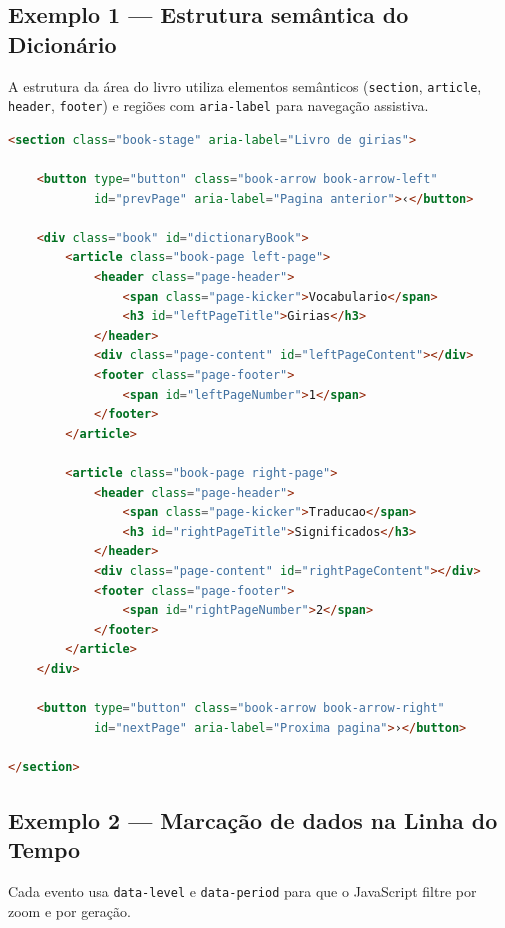 \documentclass[12pt,a4paper]{article}
\begin{document}
\subsection{Exemplo 1 — Estrutura semântica do Dicionário}

A estrutura da área do livro utiliza elementos semânticos (\texttt{section}, \texttt{article},
\texttt{header}, \texttt{footer}) e regiões com \texttt{aria-label} para navegação assistiva.

\begin{lstlisting}[language=HTML, caption={Estrutura principal do livro}]
<section class="book-stage" aria-label="Livro de girias">

    <button type="button" class="book-arrow book-arrow-left"
            id="prevPage" aria-label="Pagina anterior">‹</button>

    <div class="book" id="dictionaryBook">
        <article class="book-page left-page">
            <header class="page-header">
                <span class="page-kicker">Vocabulario</span>
                <h3 id="leftPageTitle">Girias</h3>
            </header>
            <div class="page-content" id="leftPageContent"></div>
            <footer class="page-footer">
                <span id="leftPageNumber">1</span>
            </footer>
        </article>

        <article class="book-page right-page">
            <header class="page-header">
                <span class="page-kicker">Traducao</span>
                <h3 id="rightPageTitle">Significados</h3>
            </header>
            <div class="page-content" id="rightPageContent"></div>
            <footer class="page-footer">
                <span id="rightPageNumber">2</span>
            </footer>
        </article>
    </div>

    <button type="button" class="book-arrow book-arrow-right"
            id="nextPage" aria-label="Proxima pagina">›</button>

</section>
\end{lstlisting}

\subsection{Exemplo 2 — Marcação de dados na Linha do Tempo}

Cada evento usa \texttt{data-level} e \texttt{data-period} para que o JavaScript filtre por zoom
e por geração.
\end{document}
